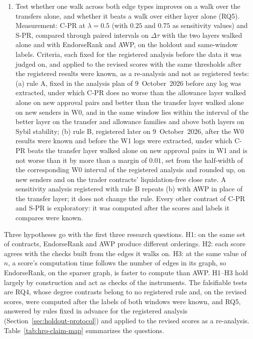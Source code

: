 \begin{enumerate}
\item[O5.] Test whether one walk across both edge types improves on a walk over the transfers alone, and whether it beats a walk over either layer alone (RQ5). Measurement: C-PR at $\lambda=0.5$ (with $0.25$ and $0.75$ as sensitivity values) and S-PR, compared through paired intervals on $\Delta\tau$ with the two layers walked alone and with EndorseRank and AWP, on the holdout and same-window labels. Criteria, each fixed for the registered analysis before the data it was judged on, and applied to the revised scores with the same thresholds after the registered results were known, as a re-analysis and not as registered tests: (a) rule A, fixed in the analysis plan of 9~October~2026 before any log was extracted, under which C-PR does no worse than the allowance layer walked alone on new approval pairs and better than the transfer layer walked alone on new senders in W0, and in the same window lies within the interval of the better layer on the transfer and allowance families and above both layers on Sybil stability; (b) rule B, registered later on 9~October~2026, after the W0 results were known and before the W1 logs were extracted, under which C-PR beats the transfer layer walked alone on new approval pairs in W1 and is not worse than it by more than a margin of $0.01$, set from the half-width of the corresponding W0 interval of the registered analysis and rounded up, on new senders and on the trader contracts' liquidation-free close rate. A sensitivity analysis registered with rule B repeats (b) with AWP in place of the transfer layer; it does not change the rule. Every other contrast of C-PR and S-PR is exploratory: it was computed after the scores and labels it compares were known.
\end{enumerate}


Three hypotheses go with the first three research questions. H1: on the same set of contracts, EndorseRank and AWP produce different orderings. H2: each score agrees with the checks built from the edges it walks on. H3: at the same value of $n$, a score's computation time follows the number of edges in its graph, so EndorseRank, on the sparser graph, is faster to compute than AWP. H1--H3 hold largely by construction and act as checks of the instruments. The falsifiable tests are RQ4, whose degree contrasts belong to no registered rule and, on the revised scores, were computed after the labels of both windows were known, and RQ5, answered by rules fixed in advance for the registered analysis (Section~\ref{sec:holdout-protocol}) and applied to the revised scores as a re-analysis. Table~\ref{tab:hrq-claim-map} summarizes the questions.

